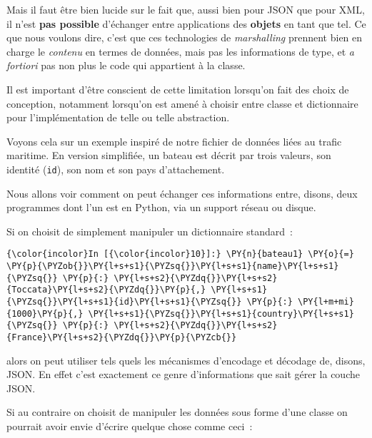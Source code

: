 Mais il faut être bien lucide sur le fait que, aussi bien pour JSON que
pour XML, il n'est \textbf{pas possible} d'échanger entre applications
des \textbf{objets} en tant que tel. Ce que nous voulons dire, c'est que
ces technologies de \emph{marshalling} prennent bien en charge le
\emph{contenu} en termes de données, mais pas les informations de type,
et \emph{a fortiori} pas non plus le code qui appartient à la classe.

Il est important d'être conscient de cette limitation lorsqu'on fait des
choix de conception, notamment lorsqu'on est amené à choisir entre
classe et dictionnaire pour l'implémentation de telle ou telle
abstraction.

    Voyons cela sur un exemple inspiré de notre fichier de données liées au
trafic maritime. En version simplifiée, un bateau est décrit par trois
valeurs, son identité (\texttt{id}), son nom et son pays d'attachement.

Nous allons voir comment on peut échanger ces informations entre,
disons, deux programmes dont l'un est en Python, via un support réseau
ou disque.

    Si on choisit de simplement manipuler un dictionnaire standard~:

    \begin{Verbatim}[commandchars=\\\{\},frame=single,framerule=0.3mm,rulecolor=\color{cellframecolor}]
{\color{incolor}In [{\color{incolor}10}]:} \PY{n}{bateau1} \PY{o}{=} \PY{p}{\PYZob{}}\PY{l+s+s1}{\PYZsq{}}\PY{l+s+s1}{name}\PY{l+s+s1}{\PYZsq{}} \PY{p}{:} \PY{l+s+s2}{\PYZdq{}}\PY{l+s+s2}{Toccata}\PY{l+s+s2}{\PYZdq{}}\PY{p}{,} \PY{l+s+s1}{\PYZsq{}}\PY{l+s+s1}{id}\PY{l+s+s1}{\PYZsq{}} \PY{p}{:} \PY{l+m+mi}{1000}\PY{p}{,} \PY{l+s+s1}{\PYZsq{}}\PY{l+s+s1}{country}\PY{l+s+s1}{\PYZsq{}} \PY{p}{:} \PY{l+s+s2}{\PYZdq{}}\PY{l+s+s2}{France}\PY{l+s+s2}{\PYZdq{}}\PY{p}{\PYZcb{}}
\end{Verbatim}


    alors on peut utiliser tels quels les mécanismes d'encodage et décodage
de, disons, JSON. En effet c'est exactement ce genre d'informations que
sait gérer la couche JSON.

    Si au contraire on choisit de manipuler les données sous forme d'une
classe on pourrait avoir envie d'écrire quelque chose comme ceci~:

